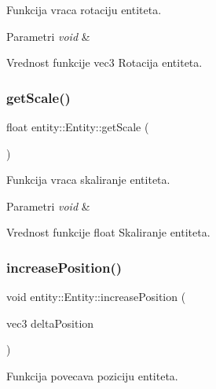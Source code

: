 Funkcija vraca rotaciju entiteta. 


\begin{DoxyParams}{Parametri}
{\em void} & \\
\hline
\end{DoxyParams}
\begin{DoxyReturn}{Vrednost funkcije}
vec3 Rotacija entiteta. 
\end{DoxyReturn}
\mbox{\label{classentity_1_1Entity_a1923a9ecf9da2ec77d6e3eeadb4bd4d7}} 
\subsubsection{\texorpdfstring{get\+Scale()}{getScale()}}
{\footnotesize\ttfamily float entity\+::\+Entity\+::get\+Scale (\begin{DoxyParamCaption}{ }\end{DoxyParamCaption})}



Funkcija vraca skaliranje entiteta. 


\begin{DoxyParams}{Parametri}
{\em void} & \\
\hline
\end{DoxyParams}
\begin{DoxyReturn}{Vrednost funkcije}
float Skaliranje entiteta. 
\end{DoxyReturn}
\mbox{\label{classentity_1_1Entity_a24a22a1554a3a412cc2583bbf87fd77c}} 
\subsubsection{\texorpdfstring{increase\+Position()}{increasePosition()}}
{\footnotesize\ttfamily void entity\+::\+Entity\+::increase\+Position (\begin{DoxyParamCaption}\item[{vec3}]{delta\+Position }\end{DoxyParamCaption})}



Funkcija povecava poziciju entiteta. 


